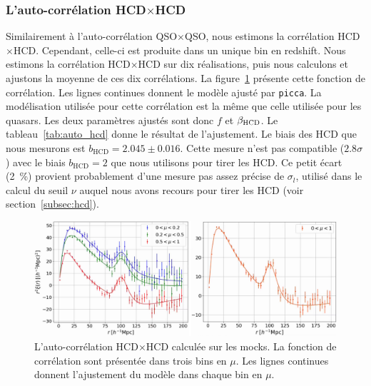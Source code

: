 
\subsubsection{L'auto-corrélation HCD$\times$HCD}

Similairement à l'auto-corrélation QSO$\times$QSO, nous estimons la corrélation HCD$\times$HCD. Cependant, celle-ci est produite dans un unique bin en redshift. Nous estimons la corrélation HCD$\times$HCD sur dix réalisations, puis nous calculons et ajustons la moyenne de ces dix corrélations.
La figure~\ref{fig:auto_hcd} présente cette fonction de corrélation. Les lignes continues donnent le modèle ajusté par \texttt{picca}.
La modélisation utilisée pour cette corrélation est la même que celle utilisée pour les quasars. Les deux paramètres ajustés sont donc $f$ et $\beta_{\textsc{HCD}}$.
Le tableau~\ref{tab:auto_hcd} donne le résultat de l'ajustement.
Le biais des HCD que nous mesurons est $b_{\mathrm{HCD}} = \num{2.045} \pm \num{0.016}$.
Cette mesure n'est pas compatible ($\num{2.8}\sigma$) avec le biais $b_{\mathrm{HCD}} = 2$ que nous utilisons pour tirer les HCD. 
Ce petit écart (\SI{2}{\percent}) provient probablement d'une mesure pas assez précise de $\sigma_l$, utilisé dans le calcul du seuil $\nu$ auquel nous avons recours pour tirer les HCD (voir section~\ref{subsec:hcd}).

\begin{figure}
  \centering
  \includegraphics[scale=0.42]{auto_hcd}
  \caption{L'auto-corrélation HCD$\times$HCD calculée sur les mocks. La fonction de corrélation sont présentée dans trois bins en $\mu$. Les lignes continues donnent l'ajustement du modèle dans chaque bin en $\mu$.}
  \label{fig:auto_hcd}
\end{figure}


